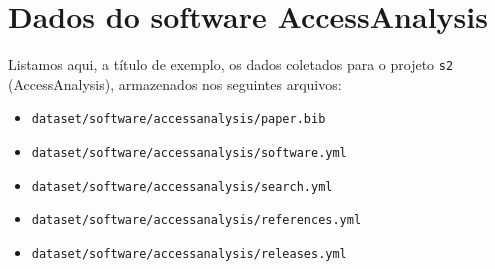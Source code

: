 \section{Dados do software AccessAnalysis}

Listamos aqui, a título de exemplo, os dados coletados para o projeto
\texttt{s2} (AccessAnalysis), armazenados nos seguintes arquivos:

\begin{itemize}
  \item \texttt{dataset/software/accessanalysis/paper.bib}
  \item \texttt{dataset/software/accessanalysis/software.yml}
  \item \texttt{dataset/software/accessanalysis/search.yml}
  \item \texttt{dataset/software/accessanalysis/references.yml}
  \item \texttt{dataset/software/accessanalysis/releases.yml}
\end{itemize}











